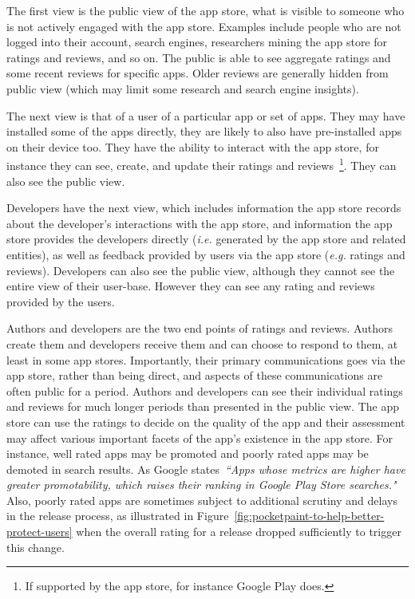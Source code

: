 The first view is the public view of the app store, what is visible to someone who is not actively engaged with the app store. Examples include people who are not logged into their account, search engines, researchers mining the app store for ratings and reviews, and so on. The public is able to see aggregate ratings and some recent reviews for specific apps. Older reviews are generally hidden from public view (which may limit some research and search engine insights).

The next view is that of a user of a particular app or set of apps. They may have installed some of the apps directly, they are likely to also have pre-installed apps on their device too. They have the ability to interact with the app store, for instance they can see, create, and update their ratings and reviews~\footnote{If supported by the app store, for instance Google Play does.}. They can also see the public view.

Developers have the next view, which includes information the app store records about the developer's interactions with the app store, and information the app store provides the developers directly (\emph{i.e.} generated by the app store and related entities), as well as feedback provided by users via the app store (\emph{e.g.} ratings and reviews). Developers can also see the public view, although they cannot see the entire view of their user-base. However they can see any rating and reviews provided by the users.

Authors and developers are the two end points of ratings and reviews. Authors create them and developers receive them and can choose to respond to them, at least in some app stores. %
Importantly, their primary communications goes via the app store, rather than being direct, and aspects of these communications are often public for a period. Authors and developers can see their individual ratings and reviews for much longer periods than presented in the public view. The app store can use the ratings to decide on the quality of the app and their assessment may affect various important facets of the app's existence in the app store. For instance, well rated apps may be promoted and poorly rated apps may be demoted in search results. As Google states~\emph{``Apps whose metrics are higher have greater promotability, which raises their ranking in Google Play Store searches."}~\citep{android_vitals_best_practices} Also, poorly rated apps are sometimes subject to additional scrutiny and delays in the release process, as illustrated in Figure~\ref{fig:pocketpaint-to-help-better-protect-users} when the overall rating for a release dropped sufficiently to trigger this change. %

